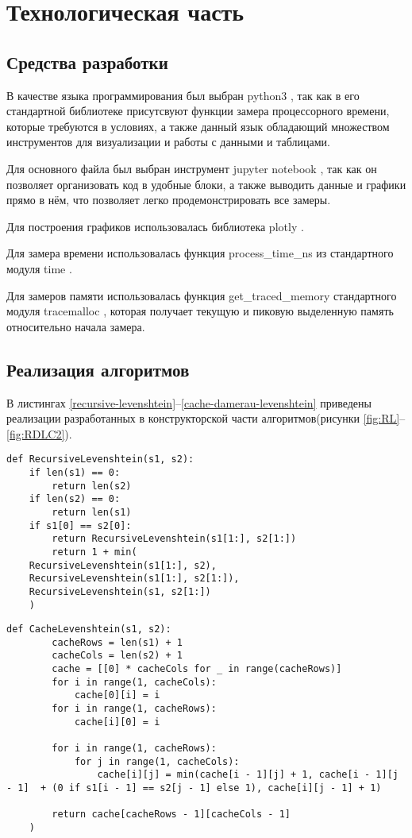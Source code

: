 \chapter{Технологическая часть}
\section{Средства разработки}

В качестве языка программирования был выбран python3 \cite{python3}, так как в его стандартной библиотеке присутсвуют функции замера процессорного времени, которые требуются в условиях, а также данный язык обладающий множеством инструментов для визуализации и работы с данными и таблицами.

Для основного файла был выбран инструмент jupyter notebook \cite{python3-jupyter}, так как он позволяет организовать код в удобные блоки,  а также выводить данные и графики прямо в нём, что позволяет легко продемонстрировать все замеры.

Для построения графиков использовалась библиотека plotly  \cite{python3-plotly}.

Для замера времени использовалась функция process\_time\_ns из стандартного модуля time \cite{python3-time}.

Для замеров памяти использовалась функция get\_traced\_memory стандартного модуля tracemalloc \cite{tracemalloc}, которая получает текущую и пиковую выделенную память относительно начала замера.

\section{Реализация алгоритмов}

В листингах \ref{recursive-levenshtein}–\ref{cache-damerau-levenshtein} приведены реализации разработанных в конструкторской части алгоритмов(рисунки \ref{fig:RL}–\ref{fig:RDLC2}).

\begin{lstlisting}[label=recursive-levenshtein,caption={Рекурсивный алгоритм нахождения расстояния Левенштейна}]
def RecursiveLevenshtein(s1, s2):
	if len(s1) == 0:
		return len(s2)
	if len(s2) == 0:
		return len(s1)
	if s1[0] == s2[0]:
		return RecursiveLevenshtein(s1[1:], s2[1:])
		return 1 + min(
	RecursiveLevenshtein(s1[1:], s2),
	RecursiveLevenshtein(s1[1:], s2[1:]),
	RecursiveLevenshtein(s1, s2[1:])
	)
\end{lstlisting}

\begin{lstlisting}[label=cache-levenshtein,caption={Итерационный алгоритм нахождения расстояния Левенштейна с кешэм}]
	def CacheLevenshtein(s1, s2):
		cacheRows = len(s1) + 1
		cacheCols = len(s2) + 1
		cache = [[0] * cacheCols for _ in range(cacheRows)]
		for i in range(1, cacheCols):
			cache[0][i] = i
		for i in range(1, cacheRows):
			cache[i][0] = i
		
		for i in range(1, cacheRows):
			for j in range(1, cacheCols):
				cache[i][j] = min(cache[i - 1][j] + 1, cache[i - 1][j - 1]  + (0 if s1[i - 1] == s2[j - 1] else 1), cache[i][j - 1] + 1)
		
		return cache[cacheRows - 1][cacheCols - 1]
	)
\end{lstlisting}


